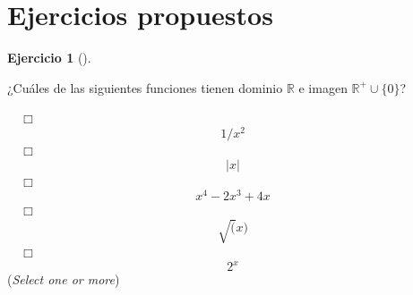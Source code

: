 \documentclass[
  a4paper,
]{scrreport}
\theoremstyle{definition}
\newtheorem{exercise}{Ejercicio}[chapter]
\theoremstyle{remark}
\begin{document}
\hypertarget{ejercicios-propuestos-1}{%
\section{Ejercicios propuestos}\label{ejercicios-propuestos-1}}

\leavevmode{}%
\begin{exercise}[]\label{exr-dominio-imagen}

¿Cuáles de las siguientes funciones tienen dominio \(\mathbb{R}\) e
imagen \(\mathbb{R}^+\cup\{0\}\)?

${\quad\Box}$ $$1/x^2$$
${\quad\Box}$ $$|x|$$
${\quad\Box}$ $$x^4-2x^3+4x$$
${\quad\Box}$ $$\sqrt(x)$$
${\quad\Box}$ $$2^x$$
(\emph{Select one or more})

\end{exercise}
\end{document}
